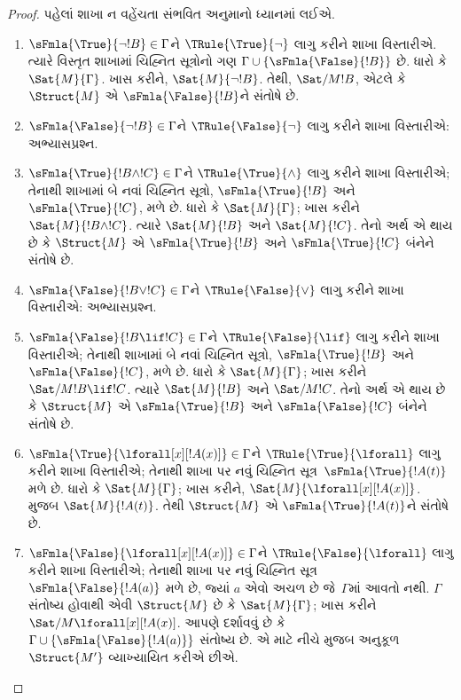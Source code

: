 \begin{proof}
પહેલાં શાખા ન વહેંચતા સંભવિત અનુમાનો ધ્યાનમાં લઈએ.
\begin{enumerate}
\item $\sFmla{\True}{\lnot !B} \in \Gamma$ને
  $\TRule{\True}{\lnot}$ લાગુ કરીને શાખા વિસ્તારીએ. ત્યારે વિસ્તૃત
  શાખામાં ચિહ્નિત સૂત્રોનો ગણ $\Gamma \cup
  \{\sFmla{\False}{!B}\}$ છે. ધારો કે
  $\Sat{M}{\Gamma}$. ખાસ કરીને,
  $\Sat{M}{\lnot !B}$. તેથી,
  $\Sat/{M}{!B}$, એટલે કે
  $\Struct{M}$ એ
  $\sFmla{\False}{!B}$ને સંતોષે છે.
\item $\sFmla{\False}{\lnot !B} \in \Gamma$ને
  $\TRule{\False}{\lnot}$ લાગુ કરીને શાખા વિસ્તારીએ: અભ્યાસપ્રશ્ન.
\item $\sFmla{\True}{!B \land !C} \in \Gamma$ને
  $\TRule{\True}{\land}$ લાગુ કરીને શાખા વિસ્તારીએ; તેનાથી શાખામાં બે
  નવાં ચિહ્નિત સૂત્રો, $\sFmla{\True}{!B}$ અને
  $\sFmla{\True}{!C}$, મળે છે. ધારો કે
  $\Sat{M}{\Gamma}$; ખાસ કરીને
  $\Sat{M}{!B \land !C}$. ત્યારે
  $\Sat{M}{!B}$ અને
  $\Sat{M}{!C}$. તેનો અર્થ એ થાય છે કે
  $\Struct{M}$ એ
  $\sFmla{\True}{!B}$ અને $\sFmla{\True}{!C}$ બંનેને સંતોષે છે.
\item $\sFmla{\False}{!B \lor !C} \in \Gamma$ને
  $\TRule{\False}{\lor}$ લાગુ કરીને શાખા વિસ્તારીએ: અભ્યાસપ્રશ્ન.
\item $\sFmla{\False}{!B \lif !C} \in \Gamma$ને
  $\TRule{\False}{\lif}$ લાગુ કરીને શાખા વિસ્તારીએ; તેનાથી શાખામાં બે
  નવાં ચિહ્નિત સૂત્રો, $\sFmla{\True}{!B}$ અને
  $\sFmla{\False}{!C}$, મળે છે. ધારો કે
  $\Sat{M}{\Gamma}$; ખાસ કરીને
  $\Sat/{M}{!B \lif !C}$. ત્યારે
  $\Sat{M}{!B}$ અને
  $\Sat/{M}{!C}$. તેનો અર્થ એ થાય છે કે
  $\Struct{M}$ એ
  $\sFmla{\True}{!B}$ અને $\sFmla{\False}{!C}$ બંનેને સંતોષે છે.

%
\item $\sFmla{\True}{\lforall[x][!A(x)]} \in \Gamma$ને
  $\TRule{\True}{\lforall}$ લાગુ કરીને શાખા વિસ્તારીએ; તેનાથી શાખા પર
  નવું ચિહ્નિત સૂત્ર~$\sFmla{\True}{!A(t)}$ મળે છે. ધારો કે
  $\Sat{M}{\Gamma}$; ખાસ કરીને,
  $\Sat{M}{\lforall[x][!A(x)]}$.
   મુજબ $\Sat{M}{!A(t)}$. તેથી
  $\Struct{M}$ એ $\sFmla{\True}{!A(t)}$ને સંતોષે છે.

\item $\sFmla{\False}{\lforall[x][!A(x)]} \in \Gamma$ને
  $\TRule{\False}{\lforall}$ લાગુ કરીને શાખા વિસ્તારીએ; તેનાથી શાખા
  પર નવું ચિહ્નિત સૂત્ર~$\sFmla{\False}{!A(a)}$ મળે છે, જ્યાં $a$
  એવો અચળ છે જે~$\Gamma$માં આવતો નથી. $\Gamma$ સંતોષ્ય હોવાથી
  એવી $\Struct{M}$ છે કે $\Sat{M}{\Gamma}$; ખાસ કરીને
  $\Sat/{M}{\lforall[x][!A(x)]}$. આપણે દર્શાવવું છે કે
  $\Gamma \cup \{\sFmla{\False}{!A(a)}\}$ સંતોષ્ય છે. એ માટે નીચે મુજબ
  અનુકૂળ~$\Struct{M'}$ વ્યાખ્યાયિત કરીએ છીએ.


\end{enumerate}
\end{proof}
